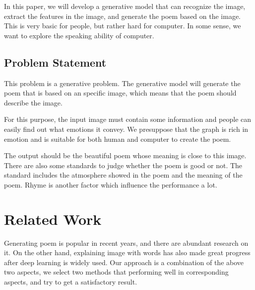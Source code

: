 \documentclass[10pt,twocolumn,letterpaper]{article}
\begin{document}
In this paper, we will develop a generative model that can recognize the image, extract the features in the image, and generate the poem based on the image. This is very basic for people, but rather hard for computer. In some sense, we want to explore the speaking ability of computer.
\subsection{Problem Statement}
This problem is a generative problem. The generative model will generate the poem that is based on an specific image, which means that the poem should describe the image. 

For this purpose, the input image must contain some information and people can easily find out what emotions it convey. We presuppose that the graph is rich in emotion and is suitable for both human and computer to create the poem.

The output should be the beautiful poem whose meaning is close to this image. There are also some standards to judge whether the poem is good or not. The standard includes the atmosphere showed in the poem and the meaning of the poem. Rhyme is another factor which influence the performance a lot.


\section{Related Work}
	Generating poem is popular in recent years, and there are abundant research on it. On the other hand, explaining image with words has also made great progress after deep learning is widely used. Our approach is a combination of the above two aspects, we select two methods that performing well in corresponding aspects, and try to get a satisfactory result.
\end{document}
